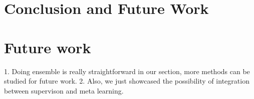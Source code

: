 \documentclass[letterpaper]{article} %
\newcommand{\jh}[1]{\textcolor{blue}{#1}}
\begin{document}
{\section{Conclusion and Future Work}


\jh{}

\section{Future work}

1. Doing ensemble is really straightforward in our section, more methods can be studied for future work.
2. Also, we just showcased the possibility of integration between supervison and meta learning.

}
\end{document}
